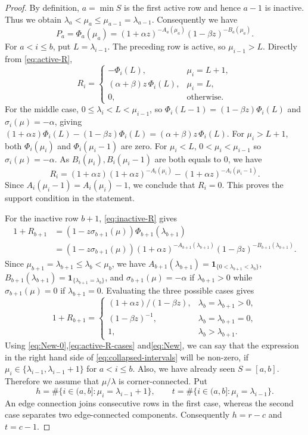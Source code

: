 \documentclass[11pt]{amsart}
\numberwithin{equation}{section}
\theoremstyle{definition}
\theoremstyle{remark}
\newcommand{\ind}{\mathbf 1}
\begin{document}
\begin{proof}
By definition, $a=\min S$ is the first active row and hence $a-1$ is inactive. Thus we obtain $\lambda_a < \mu_a \leq \mu_{a-1}=\lambda_{a-1} $. Consequently we have
\begin{equation}
    \label{eq:New-0}
P_a=\Phi_a(\mu_a)=
  (1+\alpha z)^{-A_a(\mu_a)}(1-\beta z)^{-B_a(\mu_a)}.
\end{equation}
For $a<i\leq b$, put $L=\lambda_{i-1}$. The preceding row is active,
so $\mu_{i-1}>L$. Directly from \eqref{eq:active-R},
\begin{equation}\label{eq:active-R-cases}
 R_i=
 \begin{cases}
  -\Phi_i(L),&\mu_i=L+1,\\
  (\alpha+\beta)z\,\Phi_i(L),&\mu_i=L,\\
  0,&\text{otherwise}.
 \end{cases}
\end{equation}
For the middle case, $0\leq\lambda_i<L<\mu_{i-1}$, so
$\Phi_i(L-1)=(1-\beta z)\Phi_i(L)$ and $\sigma_i(\mu)=-\alpha$, giving
$(1+\alpha z)\Phi_i(L)-(1-\beta z)\Phi_i(L)=(\alpha+\beta)z\,\Phi_i(L)$. For $\mu_i>L+1$, both
$\Phi_i(\mu_i)$ and $\Phi_i(\mu_i-1)$ are zero. 
For $\mu_i<L$, $0 < \mu_i < \mu_{i-1}$ so $\sigma_i(\mu)=-\alpha$. As $B_i(\mu_i),B_i(\mu_i-1)$ are both equals to $0$, we have
$$ R_i=(1+\alpha z) (1+\alpha z)^{-A_i(\mu_i)}-(1+\alpha z)^{-A_i(\mu_i-1)}. $$
Since $ A_i(\mu_i-1)=A_i(\mu_i)-1$, we conclude that $R_i=0$. This proves the
support condition in the statement.

For the inactive row $b+1$,
\eqref{eq:inactive-R} gives
\begin{align*}
 1+R_{b+1}&=(1-z\sigma_{b+1}(\mu))\Phi_{b+1}(\lambda_{b+1})\\
 &=(1-z\sigma_{b+1}(\mu))(1+\alpha z)^{-A_{b+1}(\lambda_{b+1})}(1-\beta z)^{-B_{b+1}(\lambda_{b+1})}.
\end{align*}
Since $\mu_{b+1}=\lambda_{b+1}\leq\lambda_b<\mu_b$, we have
$A_{b+1}(\lambda_{b+1})=\ind_{\{0<\lambda_{b+1}<\lambda_b\}}$,
$B_{b+1}(\lambda_{b+1})=\ind_{\{\lambda_{b+1}=\lambda_b\}}$, and
$\sigma_{b+1}(\mu)=-\alpha$ if $\lambda_{b+1}>0$ while $\sigma_{b+1}(\mu)=0$ if
$\lambda_{b+1}=0$. Evaluating the three possible cases gives
\begin{equation}
    \label{eq:New}
     1+R_{b+1}=
 \begin{cases}
 (1+\alpha z)/(1-\beta z),&\lambda_b=\lambda_{b+1}>0,\\
 (1-\beta z)^{-1},&\lambda_b=\lambda_{b+1}=0,\\
 1,&\lambda_b>\lambda_{b+1}.
 \end{cases}
\end{equation}
Using \eqref{eq:New-0},\eqref{eq:active-R-cases} and\eqref{eq:New}, we can say that the expression in the right hand side of \eqref{eq:collapsed-intervals} will be non-zero, if $\mu_i \in \{\lambda_{i-1},\lambda_{i-1}+1\}$ for $a < i \leq b$. Also, we have already seen $S=[a,b]$. Therefore we assume that $\mu/\lambda$ is corner-connected. Put
\[
 h=\#\{i\in(a,b]:\mu_i=\lambda_{i-1}+1\},\qquad
 t=\#\{i\in(a,b]:\mu_i=\lambda_{i-1}\}.
\]
An edge connection joins consecutive rows in the first case, whereas
the second case separates two edge-connected components. Consequently
$h=r-c$ and $t=c-1$.


\end{proof}
\end{document}
